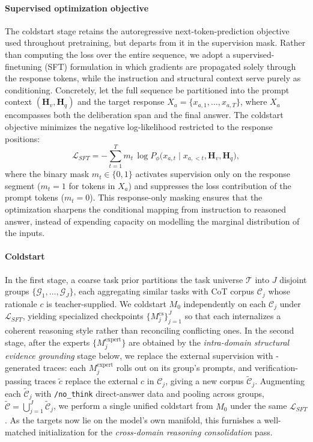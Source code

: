 \paragraph{Supervised optimization objective} The coldstart stage retains the autoregressive next-token-prediction objective used throughout pretraining, but departs from it in the supervision mask. Rather than computing the loss over the entire sequence, we adopt a supervised-finetuning (SFT) formulation in which gradients are propagated solely through the response tokens, while the instruction and structural context serve purely as conditioning. Concretely, let the full sequence be partitioned into the prompt context $(\mathbf{H}_v, \mathbf{H}_q)$ and the target response $X_a = \{x_{a,1}, \dots, x_{a,T}\}$, where $X_a$ encompasses both the deliberation span and the final answer. The coldstart objective minimizes the negative log-likelihood restricted to the response positions:
\begin{equation}
    \mathcal{L}_{SFT} = -\sum_{t=1}^{T} m_t \, \log P_\phi \big( x_{a,t} \mid x_{a,<t}, \mathbf{H}_v, \mathbf{H}_q \big),
\end{equation}
where the binary mask $m_t \in \{0, 1\}$ activates supervision only on the response segment ($m_t = 1$ for tokens in $X_a$) and suppresses the loss contribution of the prompt tokens ($m_t = 0$). This response-only masking ensures that the optimization sharpens the conditional mapping from instruction to reasoned answer, instead of expending capacity on modelling the marginal distribution of the inputs.

\paragraph{Coldstart} In the first stage, a coarse task prior partitions the task universe $\mathcal{T}$ into $J$ disjoint groups $\{\mathcal{G}_1, \dots, \mathcal{G}_J\}$, each aggregating similar tasks with CoT corpus $\mathcal{C}_j$ whose rationale $c$ is teacher-supplied. We coldstart $M_0$ independently on each $\mathcal{C}_j$ under $\mathcal{L}_{SFT}$, yielding specialized checkpoints $\{M_j^{\text{cs}}\}_{j=1}^{J}$ so that each internalizes a coherent reasoning style rather than reconciling conflicting ones. In the second stage, after the experts $\{M_j^{\text{expert}}\}$ are obtained by the \emph{intra-domain structural evidence grounding} stage below, we replace the external supervision with \projName-generated traces: each $M_j^{\text{expert}}$ rolls out on its group's prompts, and verification-passing traces $\tilde{c}$ replace the external $c$ in $\mathcal{C}_j$, giving a new corpus $\tilde{\mathcal{C}}_j$. Augmenting each $\tilde{\mathcal{C}}_j$ with \texttt{/no\_think} direct-answer data and pooling across groups, $\tilde{\mathcal{C}} = \bigcup_{j=1}^{J} \tilde{\mathcal{C}}_j$, we perform a single unified coldstart from $M_0$ under the same $\mathcal{L}_{SFT}$. As the targets now lie on the model's own manifold, this furnishes a well-matched initialization for the \emph{cross-domain reasoning consolidation} pass.

